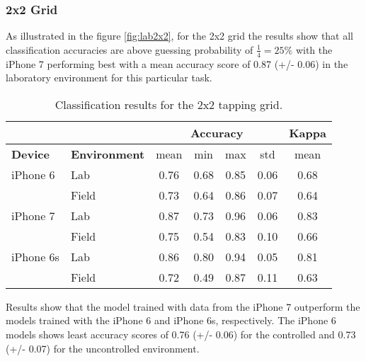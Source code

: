 \subsubsection{2x2 Grid}
As illustrated in the figure \ref{fig:lab2x2}, for the 2x2 grid the results show that all classification accuracies are above guessing probability of $\frac{1}{4} = 25\%$ with the iPhone 7 performing best with a mean accuracy score of 0.87 (+/- 0.06) in the laboratory environment for this particular task.

\begin{table}[h!]
  \centering
\begin{tabular}{|l|l|c|c|c|c|c|}
  \cline{3-7}
  \multicolumn{2}{c}{} & \multicolumn{4}{|c|}{\textbf{Accuracy}} & \textbf{Kappa} \\
  \hline
  \textbf{Device} & \textbf{Environment} & mean &   min &   max  & std &  mean \\
  \hline
  iPhone 6 & Lab &      0.76 &     0.68 &     0.85 &     0.06 &        0.68 \\
  & Field &      0.73 &     0.64 &     0.86 &     0.07 &        0.64 \\
  \hline
iPhone 7 & Lab &      0.87 &     0.73 &     0.96 &     0.06 &        0.83 \\
  & Field &      0.75 &     0.54 &     0.83 &     0.10 &        0.66 \\
  \hline
iPhone 6s & Lab &      0.86 &     0.80 &     0.94 &     0.05 &        0.81 \\
  & Field &      0.72 &     0.49 &     0.87 &     0.11 &        0.63 \\
  \hline
\end{tabular}
  \caption{Classification results for the 2x2 tapping grid.}
\end{table}

Results show that the model trained with data from the iPhone 7 outperform the models trained with the iPhone 6 and iPhone 6s, respectively. The iPhone 6 models shows least accuracy scores of 0.76 (+/- 0.06) for the controlled and 0.73 (+/- 0.07) for the uncontrolled environment.


